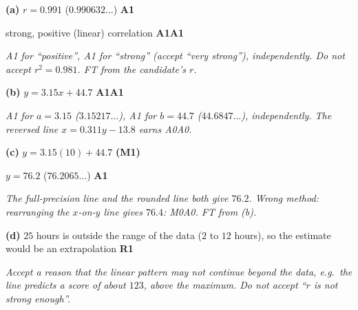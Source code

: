\documentclass[12pt, twoside]{article}
\begin{document}
\begin{enumerate}[itemsep=0.3cm]
\textbf{(a)} $r = 0.991$ \quad ($0.990632\ldots$) \hfill \textbf{A1}

strong, positive (linear) correlation \hfill \textbf{A1A1}

\emph{A1 for ``positive'', A1 for ``strong'' (accept ``very strong''),
independently. Do not accept $r^{2} = 0.981$. FT from the candidate's $r$.}

\textbf{(b)} $y = 3.15x + 44.7$ \hfill \textbf{A1A1}

\emph{A1 for $a = 3.15$ ($3.15217\ldots$), A1 for $b = 44.7$
($44.6847\ldots$), independently. The reversed line $x = 0.311y - 13.8$
earns A0A0.}

\textbf{(c)} $y = 3.15(10) + 44.7$ \hfill \textbf{(M1)}

$y = 76.2$ \quad ($76.2065\ldots$) \hfill \textbf{A1}

\emph{The full-precision line and the rounded line both give $76.2$. Wrong
method: rearranging the $x$-on-$y$ line gives $76.4$: M0A0. FT from (b).}

\textbf{(d)} $25$ hours is outside the range of the data ($2$ to $12$
hours), so the estimate would be an extrapolation \hfill \textbf{R1}

\emph{Accept a reason that the linear pattern may not continue beyond the
data, e.g.\ the line predicts a score of about $123$, above the maximum. Do not
accept ``$r$ is not strong enough''.}

\end{enumerate}
\end{document}
